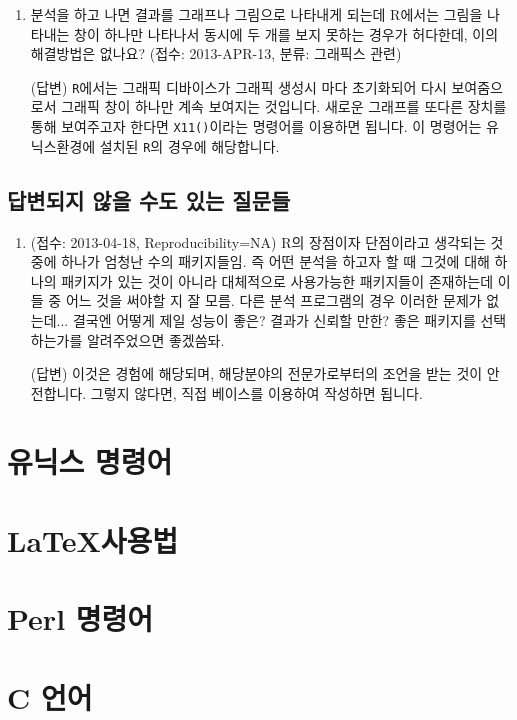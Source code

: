 \documentclass{report}
\begin{document}
\begin{enumerate}
	\item 분석을 하고 나면 결과를 그래프나 그림으로 나타내게 되는데 R에서는 그림을 나타내는 창이 하나만 나타나서 동시에 두 개를 보지 못하는 경우가 허다한데, 이의 해결방법은 없나요? (접수: 2013-APR-13, 분류: 그래픽스 관련) 
	
	\textsf{(답변)} \texttt{R}에서는 그래픽 디바이스가 그래픽 생성시 마다 초기화되어 다시 보여줌으로서 그래픽 창이 하나만 계속 보여지는 것입니다.  새로운 그래프를 또다른 장치를 통해 보여주고자 한다면 \texttt{X11()}이라는 명령어를 이용하면 됩니다.  
	이 명령어는 유닉스환경에 설치된 \texttt{R}의 경우에 해당합니다.  
	


\end{enumerate}


\section{답변되지 않을 수도 있는 질문들}

\begin{enumerate}
	\item (접수: 2013-04-18, Reproducibility=NA) R의 장점이자 단점이라고 생각되는 것 중에 하나가 엄청난 수의 패키지들임. 즉 어떤 분석을 하고자 할 때 그것에 대해 하나의 패키지가 있는 것이 아니라 대체적으로 사용가능한 패키지들이 존재하는데 이들 중 어느 것을 써야할 지 잘 모름. 다른 분석 프로그램의 경우 이러한 문제가 없는데... 결국엔 어떻게 제일 성능이 좋은? 결과가 신뢰할 만한? 좋은 패키지를 선택하는가를 알려주었으면 좋겠씀돠.
	
	\textsf{(답변)} 이것은 경험에 해당되며, 해당분야의 전문가로부터의 조언을 받는 것이 안전합니다.  그렇지 않다면, 직접 베이스를 이용하여 작성하면 됩니다. 
	
\end{enumerate}



\chapter{유닉스 명령어}

\chapter{\LaTeX 사용법}

\chapter{Perl 명령어}

\chapter{C 언어} 


\nocite{GNUR}
\nocite{GNUR-FAQ}



\end{document}
